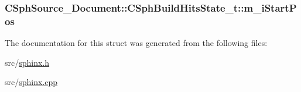 \hypertarget{structCSphSource__Document_1_1CSphBuildHitsState__t_a4a7254c913ebaffb709dec6bac772412}{
\subsubsection[{m\-\_\-i\-Start\-Pos}]{ C\-Sph\-Source\-\_\-\-Document\-::\-C\-Sph\-Build\-Hits\-State\-\_\-t\-::m\-\_\-i\-Start\-Pos}}\label{structCSphSource__Document_1_1CSphBuildHitsState__t_a4a7254c913ebaffb709dec6bac772412}


The documentation for this struct was generated from the following files\-:\begin{DoxyCompactItemize}
\item 
src/\hyperlink{sphinx_8h}{sphinx.\-h}\item 
src/\hyperlink{sphinx_8cpp}{sphinx.\-cpp}\end{DoxyCompactItemize}
